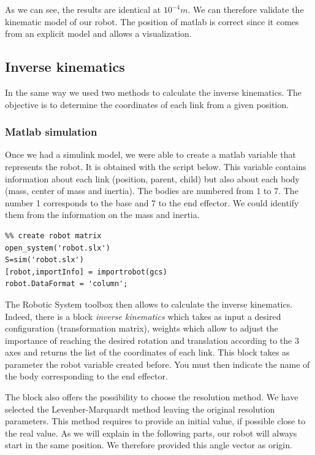 \bigbreak
As we can see, the results are identical at $10^{-4}m$. We can therefore validate the kinematic model of our robot. The position of matlab is correct since it comes from an explicit model and allows a visualization.

\subsection{Inverse kinematics}

\hspace{\parindent} In the same way we used two methods to calculate the inverse kinematics. The objective is to determine the coordinates of each link from a given position.

\subsubsection{Matlab simulation}

\hspace{\parindent} Once we had a simulink model, we were able to create a matlab variable that represents the robot. It is obtained with the script below.  This variable contains information about each link (position, parent, child) but also about each body (mass, center of mass and inertia). The bodies are numbered from 1 to 7. The number 1 corresponds to the base and 7 to the end effector. We could identify them from the information on the mass and inertia.

\begin{verbatim}
%% create robot matrix
open_system('robot.slx')
S=sim('robot.slx')
[robot,importInfo] = importrobot(gcs)
robot.DataFormat = 'column';
\end{verbatim}

\bigbreak
The Robotic System toolbox then allows to calculate the inverse kinematics. Indeed, there is a block \textit{inverse kinematics} which takes as input a desired configuration (transformation matrix), weights which allow to adjust the importance of reaching the desired rotation and translation according to the 3 axes and returns the list of the coordinates of each link. This block takes as parameter the robot variable created before. You must then indicate the name of the body corresponding to the end effector. 

\bigbreak
The block also offers the possibility to choose the resolution method. We have selected the Levenber-Marquardt method leaving the original resolution parameters. This method requires to provide an initial value, if possible close to the real value. As we will explain in the following parts, our robot will always start in the same position. We therefore provided this angle vector as origin.

